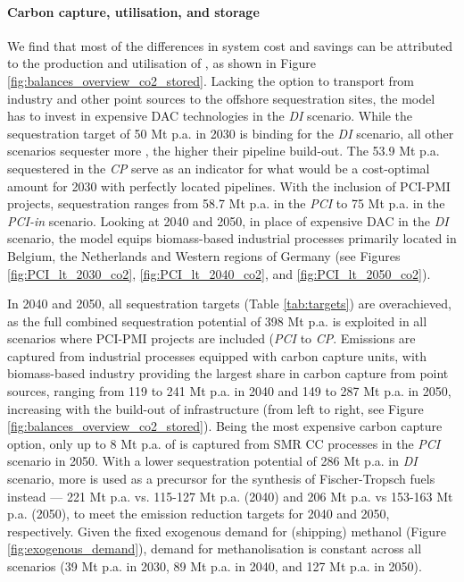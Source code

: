\documentclass[preprint,12pt,sort&compress]{elsarticle}
\begin{document}
\paragraph{Carbon capture, utilisation, and storage}
\label{sec:ccus}
We find that most of the differences in system cost and savings can be attributed to the production and utilisation of , as shown in Figure \ref{fig:balances_overview_co2_stored}. Lacking the option to transport  from industry and other point sources to the offshore sequestration sites, the model has to invest in expensive DAC technologies in the \textit{DI} scenario. While the sequestration target of 50 Mt p.a. in 2030 is binding for the \textit{DI} scenario, all other scenarios sequester more , the higher their  pipeline build-out. The 53.9 Mt p.a.  sequestered in the \textit{CP} serve as an indicator for what would be a cost-optimal amount for 2030 with perfectly located pipelines. With the inclusion of PCI-PMI projects,  sequestration ranges from 58.7 Mt p.a. in the \textit{PCI} to 75 Mt p.a. in the \textit{PCI-in} scenario. 
Looking at 2040 and 2050, in place of expensive DAC in the \textit{DI} scenario, the model equips biomass-based industrial processes primarily located in Belgium, the Netherlands and Western regions of Germany (see Figures \ref{fig:PCI_lt_2030_co2}, \ref{fig:PCI_lt_2040_co2}, and \ref{fig:PCI_lt_2050_co2}). 

In 2040 and 2050, all sequestration targets (Table \ref{tab:targets}) are overachieved, as the full combined  sequestration potential of 398 Mt p.a. is exploited in all scenarios where PCI-PMI projects are included (\textit{PCI} to \textit{CP}. Emissions are captured from industrial processes equipped with carbon capture units, with biomass-based industry providing the largest share in carbon capture from point sources, ranging from 119 to 241 Mt p.a. in 2040 and 149 to 287 Mt p.a. in 2050, increasing with the build-out of  infrastructure (from left to right, see Figure \ref{fig:balances_overview_co2_stored}). Being the most expensive carbon capture option, only up to 8 Mt p.a. of  is captured from SMR CC processes in the \textit{PCI} scenario in 2050. 
With a lower sequestration potential of 286 Mt p.a. in \textit{DI} scenario, more  is used as a precursor for the synthesis of Fischer-Tropsch fuels instead --- 221 Mt p.a. vs. 115-127 Mt p.a. (2040) and 206 Mt p.a. vs 153-163 Mt p.a. (2050), to meet the emission reduction targets for 2040 and 2050, respectively. 
Given the fixed exogenous demand for (shipping) methanol (Figure \ref{fig:exogenous_demand}),  demand for methanolisation is constant across all scenarios (39 Mt p.a. in 2030, 89 Mt p.a. in 2040, and 127 Mt p.a. in 2050). 
\end{document}
